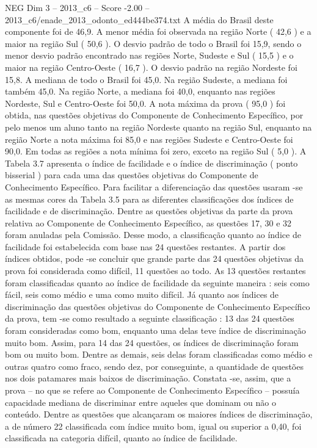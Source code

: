 \begin{textsample}{NEG Dim 3 – 2013\_c6 – Score -2.00 – 2013\_c6/enade\_2013\_odonto\_ed444be374.txt}
A média do Brasil deste componente foi de 46,9.
A menor média foi observada na região Norte ( 42,6 ) e a maior na região Sul ( 50,6 ).
O desvio padrão de todo o Brasil foi 15,9, sendo o menor desvio padrão encontrado nas regiões Norte, Sudeste e Sul ( 15,5 ) e o maior na região Centro-Oeste ( 16,7 ).
O desvio padrão na região Nordeste foi 15,8.
A mediana de todo o Brasil foi 45,0.
Na região Sudeste, a mediana foi também 45,0.
Na região Norte, a mediana foi 40,0, enquanto nas regiões Nordeste, Sul e Centro-Oeste foi 50,0.
A nota máxima da prova ( 95,0 ) foi obtida, nas questões objetivas do Componente de Conhecimento Específico, por pelo menos um aluno tanto na região Nordeste quanto na região Sul, enquanto na região Norte a nota máxima foi 85,0 e nas regiões Sudeste e Centro-Oeste foi 90,0.
Em todas as regiões a nota mínima foi zero, exceto na região Sul ( 5,0 ).
A Tabela 3.7 apresenta o índice de facilidade e o índice de discriminação ( ponto bisserial ) para cada uma das questões objetivas do Componente de Conhecimento Específico.
Para facilitar a diferenciação das questões usaram -se as mesmas cores da Tabela 3.5 para as diferentes classificações dos índices de facilidade e de discriminação.
Dentre as questões objetivas da parte da prova relativa ao Componente de Conhecimento Específico, as questões 17, 30 e 32 foram anuladas pela Comissão.
Desse modo, a classificação quanto ao índice de facilidade foi estabelecida com base nas 24 questões restantes.
A partir dos índices obtidos, pode -se concluir que grande parte das 24 questões objetivas da prova foi considerada como difícil, 11 questões ao todo.
As 13 questões restantes foram classificadas quanto ao índice de facilidade da seguinte maneira : seis como fácil, seis como médio e uma como muito difícil.
Já quanto aos índices de discriminação das questões objetivas do Componente de Conhecimento Específico da prova, tem -se como resultado a seguinte classificação : 13 das 24 questões foram consideradas como bom, enquanto uma delas teve índice de discriminação muito bom.
Assim, para 14 das 24 questões, os índices de discriminação foram bom ou muito bom.
Dentre as demais, seis delas foram classificadas como médio e outras quatro como fraco, sendo dez, por conseguinte, a quantidade de questões nos dois patamares mais baixos de discriminação.
Constata -se, assim, que a prova – no que se refere ao Componente de Conhecimento Específico – possuía capacidade mediana de discriminar entre aqueles que dominam ou não o conteúdo.
Dentre as questões que alcançaram os maiores índices de discriminação, a de número 22 classificada com índice muito bom, igual ou superior a 0,40, foi classificada na categoria difícil, quanto ao índice de facilidade.

\end{textsample}
